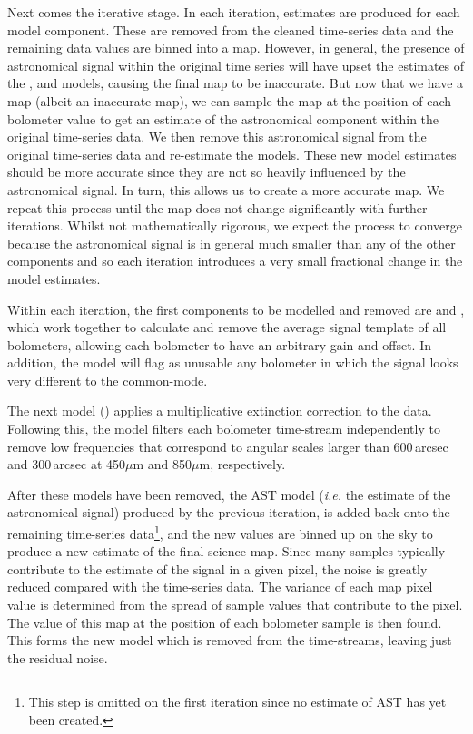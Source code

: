 \begin{enumdesc}
  Next comes the iterative stage. In each iteration, estimates are
  produced for each model component. These are removed from the cleaned
  time-series data and the remaining data values are binned into a map.
  However, in general, the presence of astronomical signal within the
  original time series will have upset the estimates of the ,
   and  models, causing the final map to be
  inaccurate. But now that we have a map (albeit an inaccurate map), we
  can sample the map at the position of each bolometer value to get an
  estimate of the astronomical component within the original time-series
  data. We then remove this astronomical signal from the original
  time-series data and re-estimate the models. These new model estimates
  should be more accurate since they are not so heavily
  influenced by the astronomical signal. In turn, this allows us to
  create a more accurate map.  We repeat this process until the map does
  not change significantly with further iterations. Whilst not
  mathematically rigorous, we expect the process to converge because the
  astronomical signal is in general much smaller than any of the other
  components and so each iteration introduces a very small fractional
  change in the model estimates.

  Within each iteration, the first components to be modelled and removed
  are  and , which work together to calculate and
  remove the average signal template of all bolometers, allowing each
  bolometer to have an arbitrary gain and offset. In addition, the
   model will flag as unusable any bolometer in which the
  signal looks very different to the common-mode.

  The next model
  () applies a multiplicative extinction correction to the
  data. Following this, the  model filters each bolometer
  time-stream independently to remove low frequencies that correspond
  to angular scales larger than 600\,arcsec and 300\,arcsec at
  450$\mu$m and 850$\mu$m, respectively.

  After these models have been removed, the AST model (\emph{i.e.} the
  estimate of the astronomical signal) produced by the previous iteration,
  is added back onto the remaining time-series data\footnote{This step is
  omitted on the first iteration since no estimate of AST has yet been
  created.}, and the new values are binned up on the sky to produce a new
  estimate of the final science map.  Since many samples typically
  contribute to the estimate of the signal in a given pixel, the noise is
  greatly reduced compared with the time-series data. The variance of
  each map pixel value is determined from the spread of sample values
  that contribute to the pixel.  The value of this map at the position
  of each bolometer sample is then found. This forms the new 
  model which is removed from the time-streams, leaving just the residual
  noise.


\end{enumdesc}
